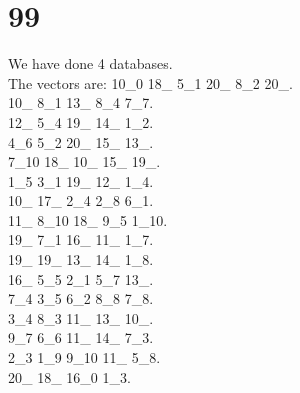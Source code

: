 \chapter{99}
\indent We have done 4 databases.\\
The vectors are:
10\_0 18\_ 5\_1 20\_ 8\_2 20\_.\\10\_ 8\_1 13\_ 8\_4 7\_7.\\12\_ 5\_4 19\_ 14\_ 1\_2.\\4\_6 5\_2 20\_ 15\_ 13\_.\\7\_10 18\_ 10\_ 15\_ 19\_.\\1\_5 3\_1 19\_ 12\_ 1\_4.\\10\_ 17\_ 2\_4 2\_8 6\_1.\\11\_ 8\_10 18\_ 9\_5 1\_10.\\19\_ 7\_1 16\_ 11\_ 1\_7.\\19\_ 19\_ 13\_ 14\_ 1\_8.\\16\_ 5\_5 2\_1 5\_7 13\_.\\7\_4 3\_5 6\_2 8\_8 7\_8.\\3\_4 8\_3 11\_ 13\_ 10\_.\\9\_7 6\_6 11\_ 14\_ 7\_3.\\2\_3 1\_9 9\_10 11\_ 5\_8.\\20\_ 18\_ 16\_0 1\_3.\\